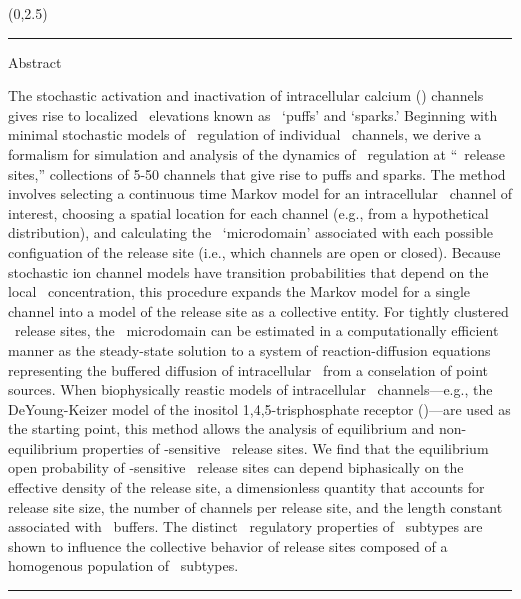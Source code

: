 \documentclass[a0]{a0poster}
\def\CHead#1{\begin{center} {\LARGE\color{DarkBlue} #1} \end{center} \bigskip}
\begin{document}
\begin{textblock}{7}(0,2.5)
\hrule\medskip
\CHead{Abstract}

The stochastic activation and inactivation of intracellular calcium (\Ca)
channels gives rise to localized \Ca\ elevations known as \Ca\ `puffs' and
`sparks.' Beginning with minimal stochastic models of \Ca\ regulation of
individual \Ca\ channels, we derive a formalism for simulation and analysis of
the dynamics of \Ca\ regulation at ``\Ca\ release sites,'' collections of 5-50
channels that give rise to puffs and sparks.  The method involves selecting a
continuous time Markov model for an intracellular \Ca\ channel of interest,
choosing a spatial location for each channel (e.g., from a hypothetical
distribution), and calculating the \Ca\ `microdomain' associated with each
possible configuation of the release site (i.e., which channels are open or
closed).  Because stochastic ion channel models have transition probabilities
that depend on the local \Ca\ concentration, this procedure expands the Markov
model for a single channel into a model of the release site as a collective
entity.  For tightly clustered \Ca\ release sites, the \Ca\ microdomain can be
estimated in a computationally efficient manner as the steady-state solution to
a system of reaction-diffusion equations representing the buffered diffusion of
intracellular \Ca\ from a conselation of point sources.  When biophysically
reastic models of intracellular \Ca\ channels---e.g., the DeYoung-Keizer model
of the inositol 1,4,5-trisphosphate receptor (\Ipr)---are used as the starting
point, this method allows the analysis of equilibrium and non-equilibrium
properties of \Ip-sensitive \Ca\ release sites.  We find that the equilibrium
open probability of \Ip-sensitive \Ca\ release sites can depend biphasically on
the effective density of the release site, a dimensionless quantity that
accounts for release site size, the number of channels per release site, and
the length constant associated with \Ca\ buffers.  The distinct \Ca\ regulatory
properties of \Ipr\ subtypes are shown to influence the collective behavior of
release sites composed of a homogenous population of \Ipr\ subtypes.

\bigskip
\hrule
\end{textblock}
\end{document}
